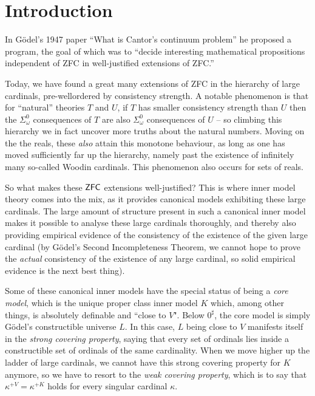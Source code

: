 \chapter{Introduction}
\thispagestyle{fancy}

\setlength{\parindent}{18pt}
\begin{onehalfspacing}

In Gödel's 1947 paper ``What is Cantor's continuum problem'' he proposed a program, the goal of which was to ``decide interesting mathematical propositions independent of \textsf{ZFC} in well-justified extensions of \textsf{ZFC}.''

\quad Today, we have found a great many extensions of \textsf{ZFC} in the hierarchy of large cardinals, pre-wellordered by consistency strength. A notable phenomenon is that for ``natural'' theories $T$ and $U$, if $T$ has smaller consistency strength than $U$ then the $\Sigma^0_\omega$ consequences of $T$ are also $\Sigma^0_\omega$ consequences of $U$ -- so climbing this hierarchy we in fact uncover more truths about the natural numbers. Moving on the the reals, these \textit{also} attain this monotone behaviour, as long as one has moved sufficiently far up the hierarchy, namely past the existence of infinitely many so-called Woodin cardinals. This phenomenon also occurs for sets of reals.

\quad So what makes these $\operatorname{\mathsf{ZFC}}$ extensions well-justified? This is where inner model theory comes into the mix, as it provides canonical models exhibiting these large cardinals. The large amount of structure present in such a canonical inner model makes it possible to analyse these large cardinals thoroughly, and thereby also providing empirical evidence of the consistency of the existence of the given large cardinal (by Gödel's Second Incompleteness Theorem, we cannot hope to prove the \textit{actual} consistency of the existence of any large cardinal, so solid empirical evidence is the next best thing).

\qquad Some of these canonical inner models have the special status of being a \textit{core model}, which is the unique proper class inner model $K$ which, among other things, is absolutely definable and ``close to $V$". Below $0^\sharp$, the core model is simply Gödel's constructible universe $L$. In this case, $L$ being close to $V$ manifests itself in the \textit{strong covering property}, saying that every set of ordinals lies inside a constructible set of ordinals of the same cardinality. When we move higher up the ladder of large cardinals, we cannot have this strong covering property for $K$ anymore, so we have to resort to the \textit{weak covering property}, which is to say that $\kappa^{+V}=\kappa^{+K}$ holds for every singular cardinal $\kappa$. 


\end{onehalfspacing}
